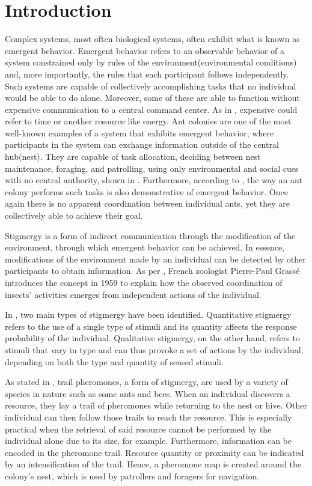\section{Introduction}
Complex systems, most often biological systems, often exhibit what is known as emergent behavior. Emergent behavior refers to an observable behavior of a system constrained only by rules of the environment(environmental conditions) and, more importantly, the rules that each participant follows independently. Such systems are capable of collectively accomplishing tasks that no individual would be able to do alone. Moreover, some of these are able to function without expensive communication to a central command center. As in \parencite{marsh_demystification_2009}, expensive could refer to time or another resource like energy. Ant colonies are one of the most well-known examples of a system that exhibits emergent behavior, where participants in the system can exchange information outside of the central hub(nest). They are capable of task allocation, deciding between nest maintenance, foraging, and patrolling, using only environmental and social cues with no central authority, shown in \parencite{gordon_organization_1996}. Furthermore, according to \parencite{adler_information_1992}, the way an ant colony performs such tasks is also demonstrative of emergent behavior. Once again there is no apparent coordination between individual ants, yet they are collectively able to achieve their goal.
\par Stigmergy is a form of indirect communication through the modification of the environment, through which emergent behavior can be achieved. In essence, modifications of the environment made by an individual can be detected by other participants to obtain information. As per \parencite{theraulaz_brief_1999}, French zoologist Pierre-Paul Grass\'e introduces the concept in 1959 to explain how the observed coordination of insects' activities emerges from independent actions of the individual.
\par In \parencite{theraulaz_brief_1999}, two main types of stigmergy have been identified. Quantitative stigmergy refers to the use of a single type of stimuli and its quantity affects the response probability of the individual. Qualitative stigmergy, on the other hand, refers to stimuli that vary in type and can thus provoke a set of actions by the individual, depending on both the type and quantity of sensed stimuli.
\par As stated in \parencite{carde_encyclopedia_2009} , trail pheromones, a form of stigmergy, are used by a variety of species in nature such as some ants and bees. When an individual discovers a resource, they lay a trail of pheromones while returning to the nest or hive. Other individual can then follow those trails to reach the resource. This is especially practical when the retrieval of said resource cannot be performed by the individual alone due to its size, for example. Furthermore, information can be encoded in the pheromone trail. Resource quantity or proximity can be indicated by an intensification of the trail. Hence, a pheromone map is created around the colony's nest, which is used by patrollers and foragers for navigation.
